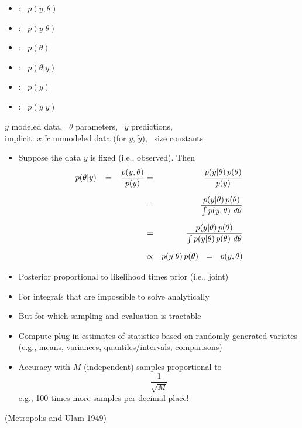 \documentclass[10pt]{report}
\newcommand{\sld}[1]{\newpage{\noindent\LARGE \ \ \
    \textcolor{MidnightBlue}{\bfseries #1}}\vspace*{4pt}}
\newcommand{\spc}{\hspace*{0.25in}}
\newcommand{\myemph}[1]{{\color{MidnightBlue}{\bfseries #1}}}
\begin{document}
\begin{itemize}
\item \myemph{Joint}: \ $p(y,\theta)$
\item \myemph{Sampling / Likelihood}: \ $p(y|\theta)$
\item \myemph{Prior}: \ $p(\theta)$
\item \myemph{Posterior}: \ $p(\theta|y)$
\item \myemph{Data Marginal}: \ $p(y)$
\item \myemph{Posterior Predictive}: \ $p(\tilde{y}|y)$
\end{itemize}

\noindent
\spc
{\footnotesize $y$ modeled data, \, $\theta$ parameters, \, $\tilde{y}$ predictions,}
\\[4pt]
\spc
{\footnotesize implicit: $x, \tilde{x}$ unmodeled data (for $y$, $\tilde{y}$), \ size constants}

\sld{Bayes's Rule for the Posterior}
%
\begin{itemize}
\item Suppose the data $y$ is fixed (i.e., observed).  Then
%
\vspace*{2pt}
\begin{eqnarray*}
p(\theta|y) 
 \hspace*{8pt} = \hspace*{8pt} \frac{p(y,\theta)}{p(y)}
& = & \frac{p(y|\theta) \, p(\theta)}{p(y)}
\\[6pt]
& = & \frac{p(y|\theta) \, p(\theta)}{\int p(y,\theta) \ d\theta}
\\[6pt]
& = & \frac{p(y|\theta) \, p(\theta)}{\int p(y|\theta) \, p(\theta) \ d\theta}
\\[6pt]
& \propto & p(y|\theta) \, p(\theta) \ \ = \ \ p(y,\theta)
\end{eqnarray*}
\item Posterior proportional to likelihood times prior (i.e., joint)
\end{itemize}


\sld{Monte Carlo Methods}
\begin{itemize}
\item For integrals that are impossible to solve analytically
\item But for which sampling and evaluation is tractable
\item Compute plug-in estimates of statistics based on
randomly generated variates (e.g., means, variances,
quantiles/intervals, comparisons)
\item Accuracy with $M$ (independent) samples proportional to
\[
\frac{1}{\sqrt{M}}
\]
e.g., 100 times more samples per decimal place!
\end{itemize}
\vfill\hfill
{\small (Metropolis and Ulam 1949)}
\end{document}

